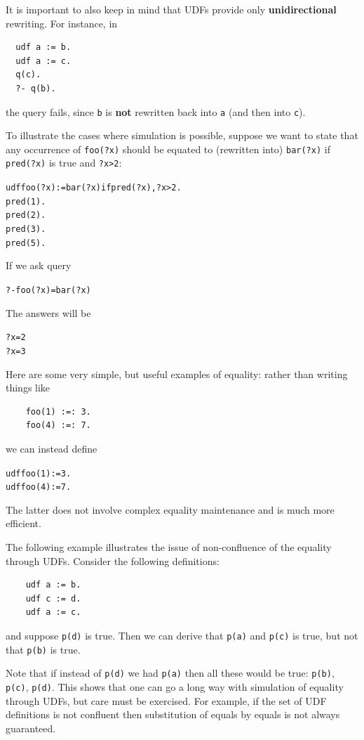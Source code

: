 \documentclass[11pt]{article}
\begin{document}
It is important to also keep in mind that UDFs provide only \textbf{unidirectional}
rewriting. For instance, in
\begin{verbatim}
  udf a := b.
  udf a := c.
  q(c).
  ?- q(b).
\end{verbatim}
the query fails, since \texttt{b} is \textbf{not} rewritten back into \texttt{a}
(and then into \texttt{c}).   

To illustrate the cases where simulation is possible, suppose we want to
state that any occurrence of \texttt{foo(?x)} should be equated to (rewritten
into) \texttt{bar(?x)} if \texttt{pred(?x)} is true and \texttt{?x>2}: 
\begin{alltt}
    udf foo(?x):=bar(?x) if  pred(?x), ?x>2.
    pred(1).
    pred(2).
    pred(3).
    pred(5).
\end{alltt}

If we ask query
\begin{alltt}
    ?- foo(?x)=bar(?x)
\end{alltt}
The answers will be
\begin{alltt}
    ?x=2
    ?x=3
\end{alltt}


Here are some very simple, but useful examples of equality: rather than
writing things like
\begin{verbatim}
    foo(1) :=: 3.
    foo(4) :=: 7.
\end{verbatim}
we can instead define
\begin{alltt}
    udf foo(1):=3.
    udf foo(4):=7.
\end{alltt}
The latter does not involve complex equality maintenance and is much more
efficient.

The following example illustrates the issue of non-confluence of the
equality through UDFs. Consider the following definitions:
\begin{verbatim}
    udf a := b.
    udf c := d.
    udf a := c.
\end{verbatim}
and suppose \texttt{p(d)} is true. Then we can derive that \texttt{p(a)}
and \texttt{p(c)} is true, but not that \texttt{p(b)} is true.    

Note that if instead of \texttt{p(d)} we had \texttt{p(a)} then all these
would be true: \texttt{p(b)}, \texttt{p(c)}, \texttt{p(d)}.
This shows that one can go a long way
with simulation of equality through UDFs, but care must be exercised.
For example, if the set of UDF definitions is not confluent then
substitution of equals by equals is not always guaranteed.
\end{document}
